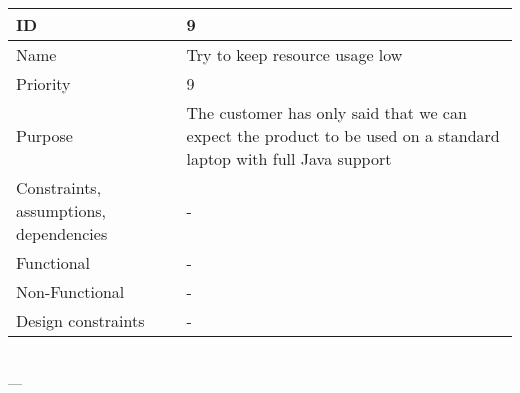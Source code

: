 \begin{center}
    \begin{tabular}{| p{4cm} | p{8cm} |}
        \hline
        ID & 9 \\
        \hline
        Name & Try to keep resource usage low  \\
        \hline
        Priority & 9 \\
        \hline
        Purpose &  The customer has only said that we can expect the product to be used on a standard laptop with full Java support \\
        \hline 
        Constraints, assumptions, dependencies & -\\
        \hline  
        Functional & -\\
        \hline
        Non-Functional & -\\ 
        \hline
        Design constraints & -\\
        \hline
    \end{tabular}
    \\  ---  \\
\end{center}
